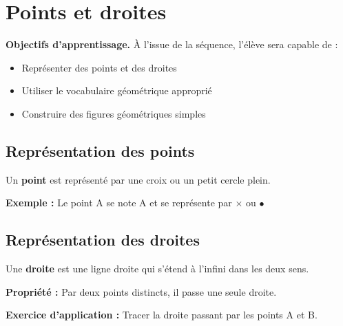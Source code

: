 \chapter{Points et droites}

\begin{objectifsbox}
\textbf{Objectifs d'apprentissage.} À l'issue de la séquence, l'élève sera capable de :
\begin{itemize}
\item Représenter des points et des droites
\item Utiliser le vocabulaire géométrique approprié
\item Construire des figures géométriques simples
\end{itemize}
\end{objectifsbox}

\section{Représentation des points}

\begin{definitionbox}
Un \textbf{point} est représenté par une croix ou un petit cercle plein.
\end{definitionbox}

\begin{examplebox}
\textbf{Exemple :} Le point A se note A et se représente par $\times$ ou $\bullet$
\end{examplebox}

\section{Représentation des droites}

\begin{definitionbox}
Une \textbf{droite} est une ligne droite qui s'étend à l'infini dans les deux sens.
\end{definitionbox}

\begin{proprietebox}
\textbf{Propriété :} Par deux points distincts, il passe une seule droite.
\end{proprietebox}

\begin{exercisebox}
\textbf{Exercice d'application :}
Tracer la droite passant par les points A et B.
\end{exercisebox}
